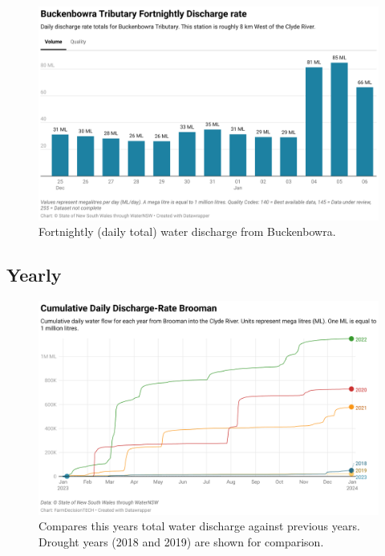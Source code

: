 \documentclass[10pt]{article}
\begin{document}
\begin{figure}[H]
\centering
\includegraphics[width=\textwidth]{fortnightly-buckenbowra.png}
\caption[Fortnightly Discharge Rate Buckenbowra]{Fortnightly (daily total) water discharge from Buckenbowra.}
\end{figure}

\subsection{Yearly}
\begin{figure}[H]
\centering
\includegraphics[width=\textwidth]{combined-dischargerate.png}
\caption[Yearly Cumulative Discharge Rate Brooman]{Compares this years total water discharge against previous years. Drought years (2018 and 2019) are shown for comparison.}
\end{figure}
\end{document}
